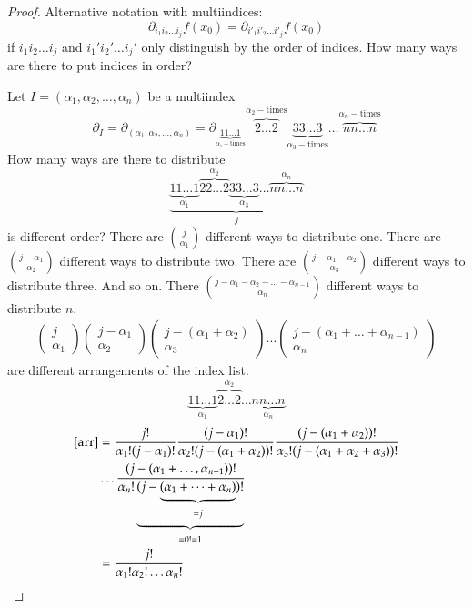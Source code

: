 \documentclass{article}
\begin{document}
\begin{proof}
  Alternative notation with multiindices:
  \[ \partial_{i_1 i_2 \dots i_j} f(x_0) = \partial_{i'_1 i'_2 \dots i'_j} f(x_0) \]
  if $i_1 i_2 \dots i_j$ and $i_1' i_2' \dots i_j'$ only distinguish by the order of indices.
  How many ways are there to put indices in order?

  Let $I = (\alpha_1, \alpha_2, \dots, \alpha_n)$ be a multiindex
  \[ \partial_I = \partial_{(\alpha_1,\alpha_2,\dots,\alpha_n)} = \partial_{\underbrace{11\dots 1}_{\alpha_1-\text{times}}} \overbrace{2 \dots 2}^{\alpha_2-\text{times}} \underbrace{3 3 \dots 3}_{\alpha_3-\text{times}} \dots \overbrace{n n \dots n}^{\alpha_n-\text{times}} \]
  How many ways are there to distribute
  \[ \underbrace{\underbrace{1 1 \dots 1}_{\alpha_1} \overbrace{2 2 \dots 2}^{\alpha_2} \underbrace{3 3 \dots 3}_{\alpha_3} \dots \overbrace{n n \dots n}^{\alpha_n}}_{j} \]
  is different order?
  There are ${j \choose \alpha_1}$ different ways to distribute one.
  There are ${j-\alpha_1 \choose \alpha_2}$ different ways to distribute two.
  There are ${j-\alpha_1-\alpha_2 \choose \alpha_3}$ different ways to distribute three.
  And so on. There ${j-\alpha_1-\alpha_2-\dots-\alpha_{n-1} \choose \alpha_n}$ different ways to distribute $n$.
  \begin{align}
    \begin{pmatrix} j \\ \alpha_1 \end{pmatrix} \begin{pmatrix} j-\alpha_1 \\ \alpha_2 \end{pmatrix} \begin{pmatrix} j-(\alpha_1 + \alpha_2) \\ \alpha_3 \end{pmatrix} \dots \begin{pmatrix} j-(\alpha_1 + \dots + \alpha_{n-1}) \\ \alpha_n \end{pmatrix} \label{arr}
  \end{align}
  are different arrangements of the index list.
  \[ \underbrace{1 1 \dots 1}_{\alpha_1} \overbrace{2 \dots 2}^{\alpha_2} \dots \underbrace{n n \dots n}_{\alpha_n} \]
  \begin{align*}
    \eqref{arr} &=
      \frac{j!}{\alpha_1!(j-\alpha_1)!}
      \frac{(j-\alpha_1)!}{\alpha_2! (j - (\alpha_1 + \alpha_2))!}
      \frac{(j-(\alpha_1 + \alpha_2))!}{\alpha_3! (j - (\alpha_1 + \alpha_2 + \alpha_3))!} \\
      &\dots
      \frac{(j - (\alpha_1 + \dots, \alpha_{n-1}))!}{\alpha_n! \underbrace{(j - \underbrace{(\alpha_1 + \dots + \alpha_n)}_{=j})!}_{= 0! = 1}} \\
      &= \frac{j!}{\alpha_1! \alpha_2! \dots \alpha_n!}
  \end{align*}


\end{proof}
\end{document}

